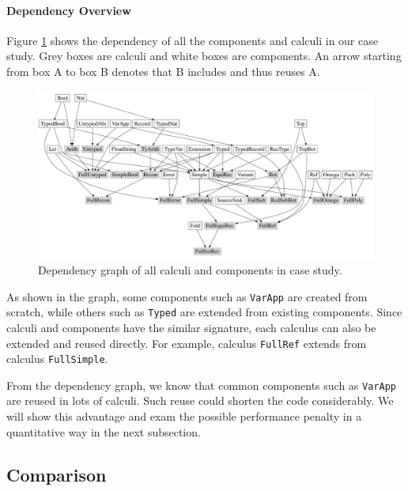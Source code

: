 \paragraph{Dependency Overview}
Figure \ref{fig:dependency} shows the
dependency of all the components and calculi in our case study. Grey
boxes are calculi and white boxes are components. An arrow starting
from box A to box B denotes that B includes and thus reuses A.

\begin{figure}
    \centering
    \includegraphics[width=\textwidth]{resources/depGraph.pdf}
    \caption{Dependency graph of all calculi and components in case study.}
    \label{fig:dependency}
\end{figure}

As shown in the graph, some components such as \lstinline{VarApp} are
created from scratch, while others such as \lstinline{Typed} are
extended from existing components. Since calculi and components have the similar signature, each calculus
can also be extended and reused directly. For example, calculus \lstinline{FullRef} extends from
calculus \lstinline{FullSimple}.

From the dependency graph, we know
that common components such as \lstinline{VarApp} are reused in
lots of calculi. Such reuse could shorten the code considerably. We
will show this advantage and exam the possible performance penalty in
a quantitative way in the next subsection.

\subsection{Comparison}\label{subsec:cs-comparison}

\newcommand\ourimpl{$\texttt{Mod}_{\texttt{OA}}$}
\newcommand\ilyaimpl{\texttt{NonMod}}
\newcommand\ourclass{$\texttt{Mod}_{\texttt{CLASS}}$}
\newcommand\ilyalongest{$\texttt{NonMod}_{\texttt{|||}}$}


